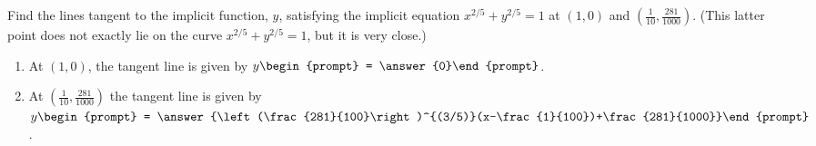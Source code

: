 \documentclass{ximera}
\author{Gregory Hartman \and Matthew Carr}
\begin{document}
\begin{exercise}




Find the lines tangent to the implicit function, $y$, satisfying the implicit equation $x^{2/5}+y^{2/5}=1$ at $(1,0)$ and $\left(\frac{1}{10},\frac{281}{1000}\right)$. (This latter point does not exactly lie on the curve $x^{2/5}+y^{2/5}=1$, but it is very close.)

\begin{enumerate}
\item At $(1,0)$, the tangent line is given by $y\begin{prompt} = \answer{0}\end{prompt}$.
\item At $\left(\frac{1}{10},\frac{281}{1000}\right)$ the tangent line is given by $y\begin{prompt} = \answer{\left(\frac{281}{100}\right)^{(3/5)}(x-\frac{1}{100})+\frac{281}{1000}}\end{prompt}$.
\end{enumerate}
\end{exercise}
\end{document}
